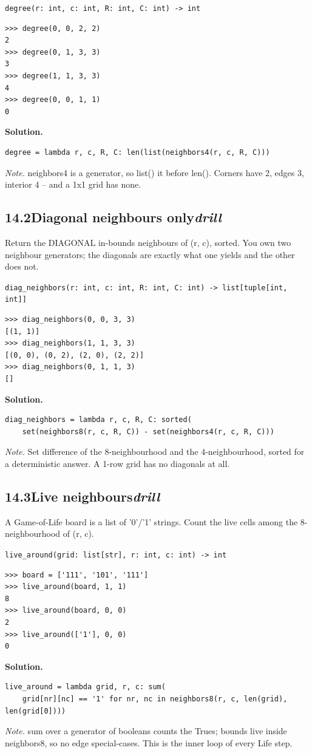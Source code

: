 \documentclass[10pt,letterpaper]{book}
\begin{document}
\noindent\texttt{degree(r: int, c: int, R: int, C: int) -> int}
\begin{lstlisting}[style=ex]
>>> degree(0, 0, 2, 2)
2
>>> degree(0, 1, 3, 3)
3
>>> degree(1, 1, 3, 3)
4
>>> degree(0, 0, 1, 1)
0
\end{lstlisting}
\noindent\textbf{Solution.}
\begin{lstlisting}[style=code]
degree = lambda r, c, R, C: len(list(neighbors4(r, c, R, C)))
\end{lstlisting}
\noindent\textit{Note.} neighbors4 is a generator, so list() it before len(). Corners have 2, edges 3, interior 4 -- and a 1x1 grid has none.

\subsection*{14.2\quad Diagonal neighbours only\hfill\textnormal{\textit{drill}}}
Return the DIAGONAL in-bounds neighbours of (r, c), sorted. You own two neighbour generators; the diagonals are exactly what one yields and the other does not.

\noindent\texttt{diag\_neighbors(r: int, c: int, R: int, C: int) -> list[tuple[int, int]]}
\begin{lstlisting}[style=ex]
>>> diag_neighbors(0, 0, 3, 3)
[(1, 1)]
>>> diag_neighbors(1, 1, 3, 3)
[(0, 0), (0, 2), (2, 0), (2, 2)]
>>> diag_neighbors(0, 1, 1, 3)
[]
\end{lstlisting}
\noindent\textbf{Solution.}
\begin{lstlisting}[style=code]
diag_neighbors = lambda r, c, R, C: sorted(
    set(neighbors8(r, c, R, C)) - set(neighbors4(r, c, R, C)))
\end{lstlisting}
\noindent\textit{Note.} Set difference of the 8-neighbourhood and the 4-neighbourhood, sorted for a deterministic answer. A 1-row grid has no diagonals at all.

\subsection*{14.3\quad Live neighbours\hfill\textnormal{\textit{drill}}}
A Game-of-Life board is a list of '0'/'1' strings. Count the live cells among the 8-neighbourhood of (r, c).

\noindent\texttt{live\_around(grid: list[str], r: int, c: int) -> int}
\begin{lstlisting}[style=ex]
>>> board = ['111', '101', '111']
>>> live_around(board, 1, 1)
8
>>> live_around(board, 0, 0)
2
>>> live_around(['1'], 0, 0)
0
\end{lstlisting}
\noindent\textbf{Solution.}
\begin{lstlisting}[style=code]
live_around = lambda grid, r, c: sum(
    grid[nr][nc] == '1' for nr, nc in neighbors8(r, c, len(grid), len(grid[0])))
\end{lstlisting}
\noindent\textit{Note.} sum over a generator of booleans counts the Trues; bounds live inside neighbors8, so no edge special-cases. This is the inner loop of every Life step.
\end{document}
